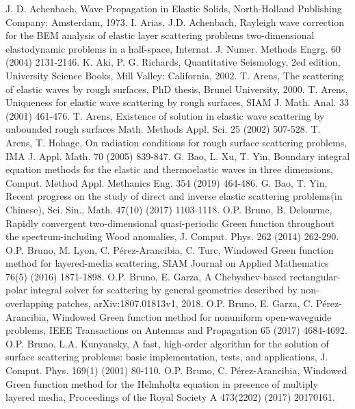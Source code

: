 \documentclass[10pt]{article}
\numberwithin{equation}{section}
\begin{document}
\begin{thebibliography}{00}
 J. D. Achenbach, Wave Propagation in Elastic Solids, North-Holland Publishing Company: Amsterdam, 1973.
 I. Arias, J.D. Achenbach, Rayleigh wave correction for the BEM analysis of elastic layer scattering problems two-dimensional elastodynamic problems in a half-space, Internat. J. Numer. Methods Engrg. 60 (2004) 2131-2146.
 K. Aki, P. G. Richards, Quantitative Seismology, 2ed edition, University Science Books, Mill Valley: California, 2002.
 T. Arens, The scattering of elastic waves by rough surfaces, PhD thesis, Brunel University, 2000.
 T. Arens, Uniqueness for elastic wave scattering by rough surfaces, SIAM J. Math. Anal. 33 (2001) 461-476.
 T. Arens, Existence of solution in elastic wave scattering by unbounded rough surfaces Math. Methods Appl. Sci. 25 (2002) 507-528.
 T. Arens, T. Hohage, On radiation conditions for rough surface scattering problems, IMA J. Appl. Math. 70 (2005) 839-847.
 G. Bao, L. Xu, T. Yin, Boundary integral equation methods for the elastic and thermoelastic waves in three dimensions, Comput. Method Appl. Methanics Eng. 354 (2019) 464-486.
 G. Bao, T. Yin, Recent progress on the study of direct and inverse elastic scattering problems(in Chinese), Sci. Sin., Math. 47(10) (2017) 1103-1118.
 O.P. Bruno, B. Delourme, Rapidly convergent two-dimensional quasi-periodic Green function throughout the spectrum-including Wood anomalies, J. Comput. Phys. 262 (2014) 262-290.
 O.P. Bruno, M. Lyon, C. P\'erez-Arancibia, C. Turc, Windowed Green function method for layered-media scattering, SIAM Journal on Applied Mathematics  76(5) (2016) 1871-1898.
 O.P. Bruno, E. Garza, A Chebyshev-based rectangular-polar integral solver for scattering by general geometries described by non-overlapping patches, arXiv:1807.01813v1, 2018.
 O.P. Bruno, E. Garza, C. P\'erez-Arancibia, Windowed Green function method for nonuniform open-waveguide problems, IEEE Transactions on Antennas and Propagation 65 (2017) 4684-4692.
 O.P. Bruno, L.A. Kunyansky, A fast, high-order algorithm for the solution of surface scattering problems: basic implementation, tests, and applications, J. Comput. Phys. 169(1) (2001) 80-110.
 O.P. Bruno, C. P\'erez-Arancibia, Windowed Green function method for the Helmholtz equation in presence of multiply layered media, Proceedings  of  the  Royal  Society  A 473(2202) (2017) 20170161.

\end{thebibliography}
\end{document}
